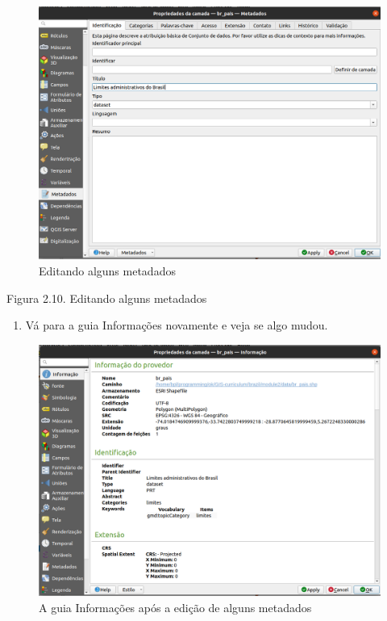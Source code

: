 \documentclass[
  portuguese,
]{krantz}
\providecommand{\tightlist}{%
  \setlength{\itemsep}{0pt}\setlength{\parskip}{0pt}}
\begin{document}
\begin{figure}
\centering
\includegraphics{media/modulo2/metadata-2.png}
\caption{Editando alguns metadados}
\end{figure}

Figura 2.10. Editando alguns metadados

\begin{enumerate}
\def\labelenumi{\arabic{enumi}.}
\setcounter{enumi}{3}
\tightlist
\item
  Vá para a guia Informações novamente e veja se algo mudou.
\end{enumerate}

\begin{figure}
\centering
\includegraphics{media/modulo2/metadata-3.png}
\caption{A guia Informações após a edição de alguns metadados}
\end{figure}
\end{document}
